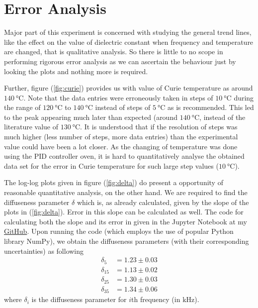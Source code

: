 \documentclass[%
 aip,
 amsmath,amssymb,
 reprint, floatfix%
]{revtex4-1}
\begin{document}
\section{Error Analysis}
    Major part of this experiment is concerned with studying the general trend lines, like the effect on the value of dielectric constant when frequency and temperature are changed, that is qualitative analysis. So there is little to no scope in performing rigorous error analysis as we can ascertain the behaviour just by looking the plots and nothing more is required. 
    \par
    Further, figure (\ref{fig:curie}) provides us with value of Curie temperature as around $\SI{140}{\celsius}$. Note that the data entries were erroneously taken in steps of $\SI{10}{\celsius}$ during the range of $\SI{120}{\celsius}$ to $\SI{140}{\celsius}$ instead of steps of $\SI{5}{\celsius}$ as is recommended. This led to the peak appearing much later than expected (around $\SI{140}{\celsius}$, instead of the literature value of $\SI{130}{\celsius}$. It is understood that if the resolution of steps was much higher (less number of steps, more data entries) than the experimental value could have been a lot closer. As the changing of temperature was done using the PID controller oven, it is hard to quantitatively analyse the obtained data set for the error in Curie temperature for such large step values ($\SI{10}{\celsius}$).
    \par
    The log-log plots given in figure (\ref{fig:delta}) do present a opportunity of reasonable quantitative analysis, on the other hand. We are required to find the diffuseness parameter $\delta$ which is, as already calculated, given by the slope of the plots in (\ref{fig:delta}). Error in this slope can be calculated as well. The code for calculating both the slope and its error in given in the Jupyter Notebook at my \href{https://github.com/peakcipher/p345-solid-state-physics-lab}{GitHub}. Upon running the code (which employs the use of popular Python library NumPy), we obtain the diffuseness parameters (with their corresponding uncertainties) as following
    \begin{equation}
    \label{eq:delta}
        \begin{aligned}
            \delta_{5} &= 1.23 \pm 0.03 \\
            \delta_{15} &= 1.13 \pm 0.02 \\
            \delta_{25} &= 1.30 \pm 0.03 \\
            \delta_{35} &= 1.34 \pm 0.06
        \end{aligned}
    \end{equation}
    where $\delta_i$ is the diffuseness parameter for $i$th frequency (in $\si{\kilo \hertz}$).
    
\end{document}
